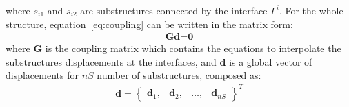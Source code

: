 \documentclass[materials,article,submit,moreauthors,pdftex]{Definitions/mdpi}
\begin{document}
where \(s_{i1}\) and \(s_{i2}\) are substructures connected by the interface \(\Gamma^i\). For the whole structure, equation~\ref{eq:coupling} can be written in the matrix form:
\begin{eqnarray}
\textbf{G}\textbf{d}=\textbf{0}
\label{eq:cond_disp}
\end{eqnarray}
where \textbf{G} is the coupling matrix which contains the equations to interpolate the substructures displacements at the interfaces, and \(\textbf{d}\) is a global vector of displacements for \(nS\) number of substructures, composed as:
\begin{eqnarray}
\textbf{d} = \left\{\begin{array}{cccc}
\textbf{d}_1, & \textbf{d}_2, &\ldots, & \textbf{d}_{nS}
\end{array}\right\}^T
\label{eq:displacements}
\end{eqnarray}
\end{document}
